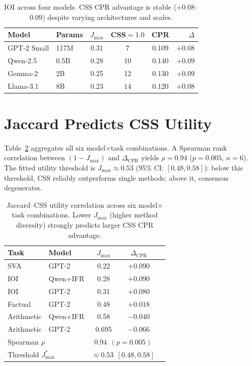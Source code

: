 \documentclass[11pt,a4paper]{article}
\newcommand{\css}{\textsc{CSS}}
\newcommand{\cpr}{\text{CPR}}
\begin{document}
\begin{table}[t]
\centering
\small
\begin{tabular}{llcccr}
\toprule
\textbf{Model} & \textbf{Params} & $J_{\max}$ & \textbf{\css{}$=1.0$} & \textbf{CPR} & $\Delta$ \\
\midrule
GPT-2 Small & 117M & 0.31 & 7 & 0.109 & $+0.08$ \\
Qwen-2.5 & 0.5B & 0.28 & 10 & 0.140 & $+0.09$ \\
Gemma-2 & 2B & 0.25 & 12 & 0.130 & $+0.09$ \\
Llama-3.1 & 8B & 0.23 & 14 & 0.120 & $+0.08$ \\
\bottomrule
\end{tabular}
\caption{IOI across four models. \css{} CPR advantage is stable ($+0.08$--$0.09$) despite varying architectures and scales.}
\label{tab:cross_model}
\end{table}

\section{Jaccard Predicts CSS Utility}
\label{sec:correlation}

Table~\ref{tab:correlation} aggregates all six model$\times$task combinations.
A Spearman rank correlation between $(1 - J_{\max})$ and $\Delta_{\cpr}$ yields $\rho = 0.94$ ($p = 0.005$, $n = 6$).
The fitted utility threshold is $J_{\max} \approx 0.53$ (95\% CI: $[0.48, 0.58]$): below this threshold, \css{} reliably outperforms single methods; above it, consensus degenerates.

\begin{table}[t]
\centering
\small
\begin{tabular}{llccc}
\toprule
\textbf{Task} & \textbf{Model} & $J_{\max}$ & $\Delta_{\cpr}$ \\
\midrule
SVA & GPT-2 & 0.22 & $+0.090$ \\
IOI & Qwen+IFR & 0.28 & $+0.090$ \\
IOI & GPT-2 & 0.31 & $+0.080$ \\
Factual & GPT-2 & 0.48 & $+0.018$ \\
Arithmetic & Qwen+IFR & 0.58 & $-0.040$ \\
Arithmetic & GPT-2 & 0.695 & $-0.066$ \\
\midrule
\multicolumn{2}{l}{Spearman $\rho$} & \multicolumn{2}{c}{$0.94~~(p = 0.005)$} \\
\multicolumn{2}{l}{Threshold $J_{\max}^*$} & \multicolumn{2}{c}{$\approx 0.53~~[0.48, 0.58]$} \\
\bottomrule
\end{tabular}
\caption{Jaccard--CSS utility correlation across six model$\times$task combinations. Lower $J_{\max}$ (higher method diversity) strongly predicts larger CSS CPR advantage.}
\label{tab:correlation}
\end{table}
\end{document}
